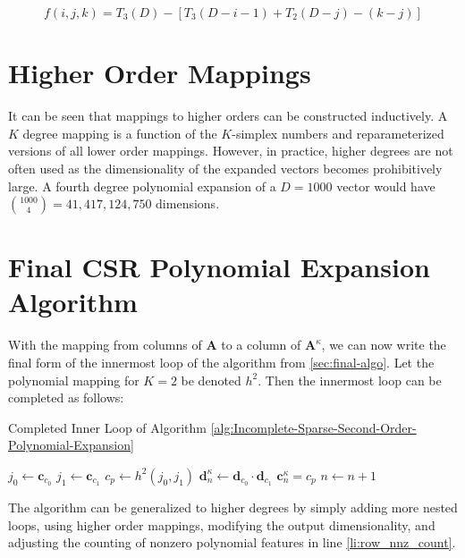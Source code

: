 \documentclass[journal]{journal}
\begin{document}
\begin{equation}
f(i, j, k) = T_3(D) - [T_3(D-i-1) + T_2(D-j) - (k-j)]
\end{equation}

\section{Higher Order Mappings}
It can be seen that mappings to higher orders can be constructed inductively.
A $K$ degree mapping is a function of the $K$-simplex numbers and reparameterized versions of all lower order mappings.
However, in practice, higher degrees are not often used as the dimensionality of the expanded vectors becomes prohibitively large.
A fourth degree polynomial expansion of a $D=1000$ vector would have $\binom{1000}{4} = 41,417,124,750$ dimensions.

\section{Final CSR Polynomial Expansion Algorithm}
With the mapping from columns of $\bm{A}$ to a column of $\bm{A}^\kappa$, we can now write the final form of the innermost loop of the algorithm from \ref{sec:final-algo}.
Let the polynomial mapping for $K=2$ be denoted $h^2$.
Then the innermost loop can be completed as follows: %

\begin{algorithm}[H]
   \caption*{Completed Inner Loop of Algorithm \ref{alg:Incomplete-Sparse-Second-Order-Polynomial-Expansion}}
   \label{alg:Inner-Loop-of-Completed-Sparse-Second-Order-Polynomial-Expansion}
\begin{algorithmic}[1]
      \STATE $j_0 \gets \bm{c}_{c_0}$
      \STATE $j_1 \gets \bm{c}_{c_1}$
      \STATE $c_p \gets h^2(j_0, j_1)$
      \STATE $\bm{d}^\kappa_{n} \gets \bm{d}_{c_0} \cdot \bm{d}_{c_1}$
      \STATE $\bm{c}^\kappa_{n} = c_p$
      \STATE $n \gets n + 1$
  \ENDFOR
\end{algorithmic}
\end{algorithm}

The algorithm can be generalized to higher degrees by simply adding more nested loops, using higher order mappings, modifying the output dimensionality, and adjusting the counting of nonzero polynomial features in line \ref{li:row_nnz_count}.
\end{document}
